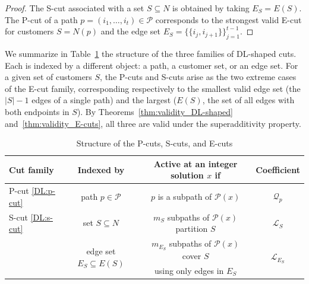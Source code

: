 \documentclass{article}
\newcommand{\rev}[1]{{\color{black}#1}}
\begin{document}
\begin{proof}
The S-cut associated with a set $S \subseteq N$ is obtained by taking $E_S = E(S)$. The P-cut of a path $p = (i_1,\dots,i_t) \in \mathcal{P}$ corresponds to the strongest valid E-cut for customers $S=N(p)$ and the edge set $E_S = \{\{i_j,i_{j+1}\}\}_{j=1}^{t-1}$.
\end{proof}

\rev{We summarize in Table~\ref{Tab:cuts_summary} the structure of the three families of DL-shaped cuts. Each is indexed by a different object: a path, a customer set, or an edge set. For a given set of customers $S$, the P-cuts and S-cuts arise as the two extreme cases of the E-cut family, corresponding respectively to the smallest valid edge set (the $|S|-1$ edges of a single path) and the largest ($E(S)$, the set of all edges with both endpoints in $S$). By Theorems~\ref{thm:validity_DL-shaped} and~\ref{thm:validity_E-cuts}, all three are valid under the superadditivity property.}

\begin{table}[H]
\centering
\rev{
\caption{Structure of the P-cuts, S-cuts, and E-cuts} \label{Tab:cuts_summary}
\begin{tabular*}{0.8\textwidth}{lccc}
\toprule
Cut family & Indexed by & Active at an integer solution $x$ if & Coefficient \\
\midrule
P-cut \eqref{DL:p-cut} & path $p \in \mathcal{P}$ & $p$ is a subpath of $\mathcal{P}(x)$ & $\mathcal{Q}_p$ \\
\addlinespace
\addlinespace
S-cut \eqref{DL:s-cut} & set $S \subseteq N$ & $m_S$ subpaths of $\mathcal{P}(x)$ partition $S$ & $\mathcal{L}_S$ \\
\addlinespace
\multirow{2}{*}{E-cut \eqref{DL:e-cut}} & \multirow{2}{*}{edge set $E_S \subseteq E(S)$} & $m_{E_S}$ subpaths of $\mathcal{P}(x)$ cover $S$ & \multirow{2}{*}{$\mathcal{L}_{E_S}$} \\
 & & using only edges in $E_S$ & \\
\bottomrule
\end{tabular*}
}
\end{table}

\end{document}
